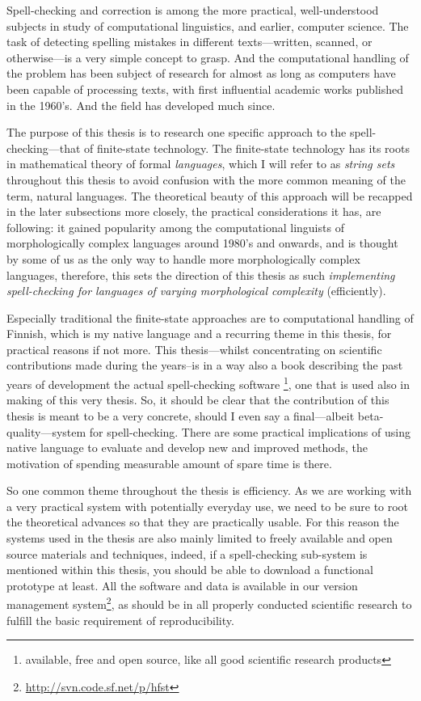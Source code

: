 \documentclass[officiallayout,draft]{unihelcompling}
\begin{document}
Spell-checking and correction is among the more practical, well-understood
subjects in study of computational linguistics, and earlier, computer science.
The task of detecting spelling mistakes in different texts---written, scanned,
or otherwise---is a very simple concept to grasp. And the computational
handling of the problem has been subject of research for almost as long as
computers have been capable of processing texts, with first influential
academic works published in the 1960's. And the field has developed much since.

The purpose of this thesis is to research one specific approach to the
spell-checking---that of finite-state technology. The finite-state technology
has its roots in mathematical theory of formal \emph{languages}, which I will
refer to as \emph{string sets} throughout this thesis to avoid confusion with
the more common meaning of the term, natural languages. The theoretical beauty
of this approach will be recapped in the later subsections more closely, the
practical considerations it has, are following: it gained popularity among the
computational linguists of morphologically complex languages around 1980's and
onwards, and is thought by some of us as the only way to handle more
morphologically complex languages, therefore, this sets the direction of this
thesis as such \emph{implementing spell-checking for languages of varying
morphological complexity} (efficiently). 

Especially traditional the finite-state approaches are to computational
handling of Finnish, which is my native language and a recurring theme in this
thesis, for practical reasons if not more. This thesis---whilst concentrating
on scientific contributions made during the years--is in a way also a book
describing the past years of development the actual spell-checking software
\footnote{available, free and open source, like all good scientific research
products}, one that is used also in making of this very thesis. So, it should
be clear that the contribution of this thesis is meant to be a very concrete,
should I even say a final---albeit beta-quality---system for spell-checking.
There are some practical implications of using native language to evaluate and
develop new and improved methods, the motivation of spending measurable amount
of spare time is there.

So one common theme throughout the thesis is efficiency. As we are working with
a very practical system with potentially everyday use, we need to be sure to
root the theoretical advances so that they are practically usable. For this
reason the systems used in the thesis are also mainly limited to freely
available and open source materials and techniques, indeed, if a spell-checking
sub-system is mentioned within this thesis, you should be able to download a
functional prototype at least. All the software and data is available in our
version management system\footnote{\url{http://svn.code.sf.net/p/hfst}}, as
should be in all properly conducted scientific research to fulfill the basic
requirement of reproducibility.
\end{document}
